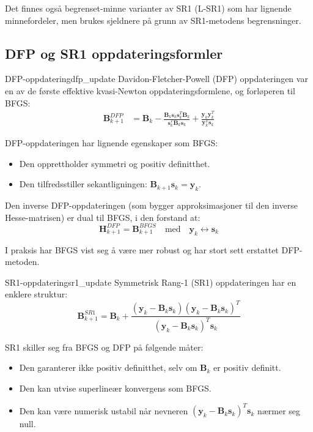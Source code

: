 Det finnes også begrenset-minne varianter av SR1 (L-SR1) som har lignende minnefordeler, men brukes sjeldnere på grunn av SR1-metodens begrensninger.

\subsection{DFP og SR1 oppdateringsformler}
\label{subsec:dfp_sr1}

\begin{definition}{DFP-oppdatering}{dfp_update}
	Davidon-Fletcher-Powell (DFP) oppdateringen var en av de første effektive kvasi-Newton oppdateringsformlene, og forløperen til BFGS:
	\begin{align*}
		\symbf{B}_{k+1}^{DFP} & = \symbf{B}_k - \frac{\symbf{B}_k\symbf{s}_k\symbf{s}_k^T\symbf{B}_k}{\symbf{s}_k^T\symbf{B}_k\symbf{s}_k} + \frac{\symbf{y}_k\symbf{y}_k^T}{\symbf{y}_k^T\symbf{s}_k}
	\end{align*}
\end{definition}

DFP-oppdateringen har lignende egenskaper som BFGS:
\begin{itemize}
	\item Den opprettholder symmetri og positiv definitthet.
	\item Den tilfredsstiller sekantligningen: $\symbf{B}_{k+1}\symbf{s}_k = \symbf{y}_k$.
\end{itemize}

Den inverse DFP-oppdateringen (som bygger approksimasjoner til den inverse Hesse-matrisen) er dual til BFGS, i den forstand at:
\[
	\symbf{H}_{k+1}^{DFP} = \symbf{B}_{k+1}^{BFGS} \quad \text{med} \quad \symbf{y}_k \leftrightarrow \symbf{s}_k
\]

I praksis har BFGS vist seg å være mer robust og har stort sett erstattet DFP-metoden.

\begin{definition}{SR1-oppdatering}{sr1_update}
	Symmetrisk Rang-1 (SR1) oppdateringen har en enklere struktur:
	\[
		\symbf{B}_{k+1}^{SR1} = \symbf{B}_k + \frac{(\symbf{y}_k - \symbf{B}_k\symbf{s}_k)(\symbf{y}_k - \symbf{B}_k\symbf{s}_k)^T}{(\symbf{y}_k - \symbf{B}_k\symbf{s}_k)^T\symbf{s}_k}
	\]
\end{definition}

SR1 skiller seg fra BFGS og DFP på følgende måter:
\begin{itemize}
	\item Den garanterer ikke positiv definitthet, selv om $\symbf{B}_k$ er positiv definitt.
	\item Den kan utvise superlineær konvergens som BFGS.
	\item Den kan være numerisk ustabil når nevneren $(\symbf{y}_k - \symbf{B}_k\symbf{s}_k)^T\symbf{s}_k$ nærmer seg null.
\end{itemize}


